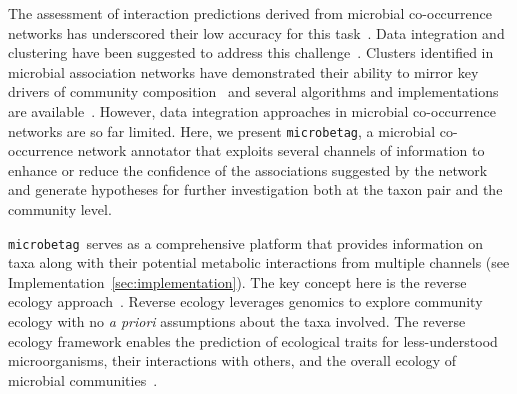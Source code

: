 \documentclass[sn-mathphys,Numbered]{sn-jnl}  %
\theoremstyle{thmstyleone}%
\theoremstyle{thmstyletwo}%
\theoremstyle{thmstylethree}%
\newcommand{\microbetag}{\texttt{microbetag}}
\begin{document}
    The assessment of interaction predictions derived from microbial co-occurrence networks has underscored their low accuracy for this task~\cite{berry2014deciphering, guo2022microbial, ma2020earth}.
    Data integration and clustering have been suggested to address this challenge~\cite{faust2021open}.
    Clusters identified in microbial association networks have demonstrated their ability to mirror key drivers of community composition~\cite{guidi2016plankton} and several algorithms and implementations are available~\cite{rottjers2020manta}.
    However, data integration approaches in microbial co-occurrence networks are so far limited.
    Here, we present \microbetag, a microbial co-occurrence network annotator that exploits several channels of information to enhance or reduce the confidence of the associations suggested by the network and generate hypotheses for further investigation both at the taxon pair and the community level.

    \microbetag~serves as a comprehensive platform that provides information on taxa along with their potential metabolic interactions from multiple channels 
    (see Implementation~\ref{sec:implementation}).
    The key concept here is the reverse ecology approach~\cite{levy2012reverse}.
    Reverse ecology leverages genomics to explore community ecology with no \textit{a priori} assumptions about the taxa involved.
    The reverse ecology framework enables the prediction of ecological traits for less-understood microorganisms, their interactions with others, and the overall ecology of microbial communities~\cite{levy2014metagenomic}.
\end{document}
